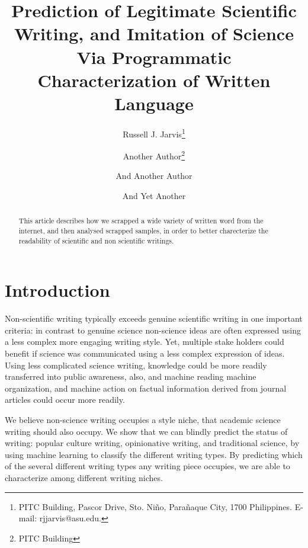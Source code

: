 \documentclass{clv3}
\begin{document}
\title{Prediction of Legitimate Scientific Writing, and Imitation of Science Via Programmatic Characterization of Written Language}

\author{Russell J. Jarvis\thanks{PITC Building, Pascor Drive, Sto. Ni\~no, Para\~naque City, 1700 Philippines. E-mail: rjjarvis@asu.edu.}}

\author{Another Author\thanks{PITC Building}}

\author{And Another Author}

\author{And Yet Another}

\maketitle

\begin{abstract}
This article describes how we scrapped a wide variety of written word from the internet, and then analysed scrapped samples, in order to better charecterize the readability of scientific and non scientific writings.
\end{abstract}

\section{Introduction}

Non-scientific writing typically exceeds genuine scientific writing in one important criteria: in contrast to genuine science non-science ideas are often expressed using a less complex more engaging writing style.  Yet, multiple stake holders could benefit if science was communicated using a less complex expression of ideas. Using less complicated science writing, knowledge could be more readily transferred into public awareness, also, and machine reading machine organization, and machine action on factual information derived from journal articles could occur more readily.

We believe non-science writing occupies a style niche, that academic science writing should also occupy. We show that we can blindly predict the status of writing: popular culture writing, opinionative writing, and traditional science, by using machine learning to classify the different writing types. By predicting which of the several different writing types any writing piece occupies, we are able to characterize among different writing niches.
\end{document}
